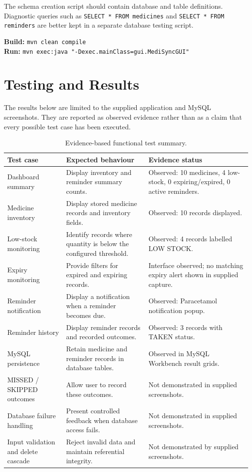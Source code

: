 \documentclass[12pt,a4paper,oneside]{report}
\begin{document}
The schema creation script should contain database and table definitions. Diagnostic queries such as \texttt{SELECT * FROM medicines} and \texttt{SELECT * FROM reminders} are better kept in a separate database testing script.

\textbf{Build:} \texttt{mvn clean compile}\\
\textbf{Run:} \texttt{mvn exec:java "-Dexec.mainClass=gui.MediSyncGUI"}

\chapter{Testing and Results}
The results below are limited to the supplied application and MySQL screenshots. They are reported as observed evidence rather than as a claim that every possible test case has been executed.

\begin{table}[H]
\centering
\small
\begin{tabularx}{\textwidth}{>{\raggedright\arraybackslash}p{} X >{\raggedright\arraybackslash}p{}}
\toprule
\textbf{Test case} & \textbf{Expected behaviour} & \textbf{Evidence status} \\
\midrule
Dashboard summary & Display inventory and reminder summary counts. & Observed: 10 medicines, 4 low-stock, 0 expiring/expired, 0 active reminders. \\
Medicine inventory & Display stored medicine records and inventory fields. & Observed: 10 records displayed. \\
Low-stock monitoring & Identify records where quantity is below the configured threshold. & Observed: 4 records labelled LOW STOCK. \\
Expiry monitoring & Provide filters for expired and expiring records. & Interface observed; no matching expiry alert shown in supplied capture. \\
Reminder notification & Display a notification when a reminder becomes due. & Observed: Paracetamol notification popup. \\
Reminder history & Display reminder records and recorded outcomes. & Observed: 3 records with TAKEN status. \\
MySQL persistence & Retain medicine and reminder records in database tables. & Observed in MySQL Workbench result grids. \\
MISSED / SKIPPED outcomes & Allow user to record these outcomes. & Not demonstrated in supplied screenshots. \\
Database failure handling & Present controlled feedback when database access fails. & Not demonstrated in supplied screenshots. \\
Input validation and delete cascade & Reject invalid data and maintain referential integrity. & Not demonstrated by supplied screenshots. \\
\bottomrule
\end{tabularx}
\caption{Evidence-based functional test summary.}
\end{table}
\end{document}
